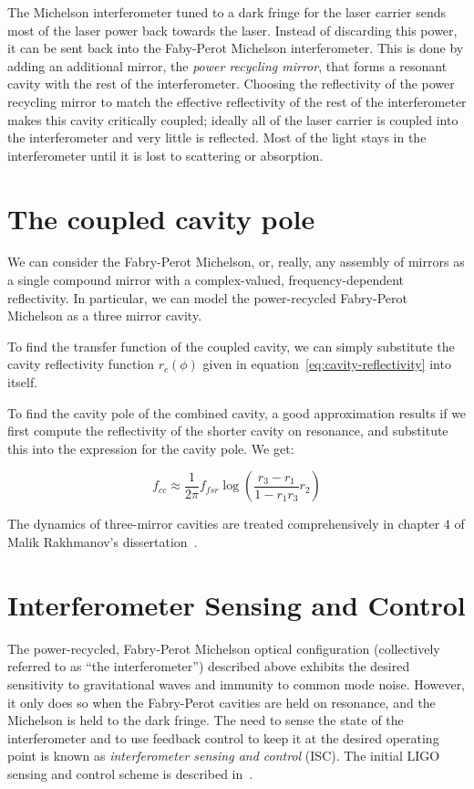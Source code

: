 The Michelson interferometer tuned to a dark fringe for the laser
carrier sends most of the laser power back towards the laser.  Instead
of discarding this power, it can be sent back into the Faby-Perot
Michelson interferometer.  This is done by adding an additional
mirror, the \emph{power recycling mirror}, that forms a resonant
cavity with the rest of the interferometer.  Choosing the reflectivity
of the power recycling mirror to match the effective reflectivity of
the rest of the interferometer makes this cavity critically coupled;
ideally all of the laser carrier is coupled into the interferometer
and very little is reflected.  Most of the light stays in the
interferometer until it is lost to scattering or absorption.

\section{The coupled cavity pole}

We can consider the Fabry-Perot Michelson, or, really, any assembly of
mirrors as a single compound mirror with a complex-valued,
frequency-dependent reflectivity.  In particular, we can model the
power-recycled Fabry-Perot Michelson as a three mirror cavity.

To find the transfer function of the coupled cavity, we can simply
substitute the cavity reflectivity function $r_c(\phi)$ given in
equation~\ref{eq:cavity-reflectivity} into itself.  

To find the cavity pole of the combined cavity, a good approximation
results if we first compute the reflectivity of the shorter cavity on
resonance, and substitute this into the expression for the cavity pole.
We get:

\begin{equation}
f_{cc} \approx \frac{1}{2\pi} f_{fsr} \log \left(\frac{r_3 - r_1}{1 - r_1 r_3} r_2\right)
\end{equation}

The dynamics of three-mirror cavities are treated comprehensively in
chapter 4 of Malik Rakhmanov's dissertation~\cite{Rakhmanov2000Dynamics}.

\section{Interferometer Sensing and Control}
\label{sec:isc}

The power-recycled, Fabry-Perot Michelson optical configuration
(collectively referred to as ``the interferometer'') described above
exhibits the desired sensitivity to gravitational waves and immunity
to common mode noise.  However, it only does so when the Fabry-Perot
cavities are held on resonance, and the Michelson is held to the dark
fringe.  The need to sense the state of the interferometer and to use
feedback control to keep it at the desired operating point is known as
\emph{interferometer sensing and control} (ISC).  The initial LIGO
sensing and control scheme is described
in~\cite{Fritschel2001Readout}.

